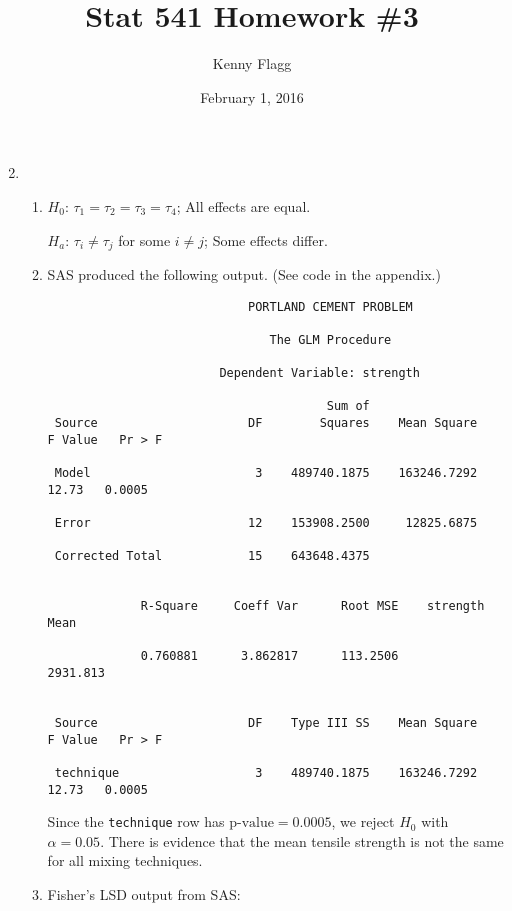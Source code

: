 \documentclass[11pt]{article}
\title{Stat 541 Homework \#3}
\author{Kenny Flagg}
\date{February 1, 2016}
\begin{document}
\maketitle

\begin{enumerate}

\setcounter{enumi}{1}
\item %

\begin{enumerate}

\item %
\(H_0\): \(\tau_1=\tau_2=\tau_3=\tau_4\); All effects are equal.

\(H_a\): \(\tau_i\neq\tau_j\) for some \(i\neq j\); Some effects differ.

\item %
SAS produced the following output. (See code in the appendix.)

\begin{verbatim}
                            PORTLAND CEMENT PROBLEM

                               The GLM Procedure
 
                        Dependent Variable: strength   

                                       Sum of
 Source                     DF        Squares    Mean Square   F Value   Pr > F

 Model                       3    489740.1875    163246.7292     12.73   0.0005

 Error                      12    153908.2500     12825.6875                   

 Corrected Total            15    643648.4375                                  


             R-Square     Coeff Var      Root MSE    strength Mean

             0.760881      3.862817      113.2506         2931.813


 Source                     DF    Type III SS    Mean Square   F Value   Pr > F

 technique                   3    489740.1875    163246.7292     12.73   0.0005
\end{verbatim}

Since the \verb|technique| row has \(\text{p-value}=0.0005\), we reject \(H_0\)
with \(\alpha=0.05\). There is evidence that the mean tensile strength is not
the same for all mixing techniques.

\pagebreak
\item %
Fisher's LSD output from SAS:


\end{enumerate}
\end{enumerate}
\end{document}
